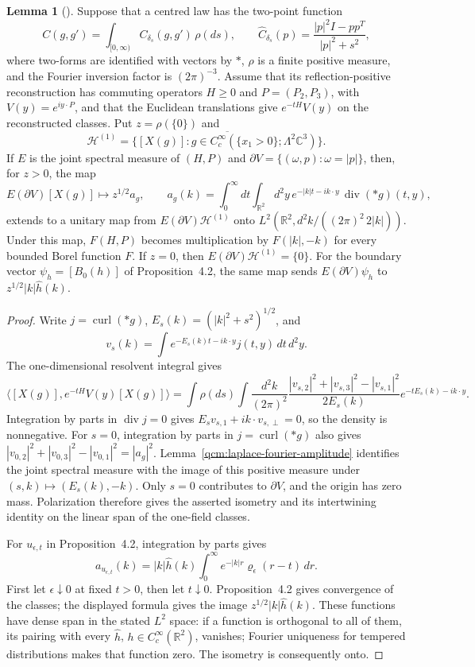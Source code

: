 \documentclass[11pt,letterpaper,reqno]{amsart}
\theoremstyle{definition}
\newtheorem{qcmlemma}[qcmproposition]{Lemma}
\newenvironment{lemma}[1][]{\pushQED{\qed}\renewcommand{\qedsymbol}{$\blacksquare$}\begin{qcmlemma}[#1]}{\popQED\end{qcmlemma}}
\begin{document}
\begin{lemma}\label{qcm:one-field-amplitude}
Suppose that a centred law has the two-point function
\[
 C(g,g')=\int_{[0,\infty)} C_{\delta_s}(g,g')\,\rho(ds),\qquad
 \widehat C_{\delta_s}(p)=
 \frac{|p|^2I-pp^T}{|p|^2+s^2},
\]
where two-forms are identified with vectors by $\ast$, $\rho$ is a
finite positive measure, and the Fourier inversion factor is
$(2\pi)^{-3}$. Assume that its reflection-positive reconstruction
has commuting operators $H\ge0$ and $P=(P_2,P_3)$, with
$V(y)=e^{iy\cdot P}$, and that the Euclidean translations give
$e^{-tH}V(y)$ on the reconstructed classes. Put
$z=\rho(\{0\})$ and
\[
 \mathcal H^{(1)}=
 \overline{\{[X(g)]:g\in C_c^\infty(\{x_1>0\};\Lambda^2\mathbb C^3)\}}.
\]
If $E$ is the joint spectral measure of $(H,P)$ and
$\partial V=\{(\omega,p):\omega=|p|\}$, then, for $z>0$, the map
\[
 E(\partial V)[X(g)]\longmapsto z^{1/2}a_g,
 \qquad
 a_g(k)=\int_0^\infty\!dt\int_{\mathbb R^2}\!d^2y\,
 e^{-|k|t-ik\cdot y}\,\operatorname{div}(\ast g)(t,y),
\]
extends to a unitary map from $E(\partial V)\mathcal H^{(1)}$ onto
$L^2(\mathbb R^2,d^2k/((2\pi)^2\,2|k|))$. Under this map,
$F(H,P)$ becomes multiplication by $F(|k|,-k)$ for every bounded
Borel function $F$. If $z=0$, then
$E(\partial V)\mathcal H^{(1)}=\{0\}$.
For the boundary vector $\psi_h=[B_0(h)]$ of Proposition~4.2,
the same map sends $E(\partial V)\psi_h$ to
$z^{1/2}|k|\hat h(k)$.
\end{lemma}
\begin{proof}
Write $j=\operatorname{curl}(\ast g)$,
$E_s(k)=(|k|^2+s^2)^{1/2}$, and
\[
 v_s(k)=\int e^{-E_s(k)t-ik\cdot y}j(t,y)\,dt\,d^2y.
\]
The one-dimensional resolvent integral gives
\[
 \langle[X(g)],e^{-tH}V(y)[X(g)]\rangle
 =\int\rho(ds)\int\frac{d^2k}{(2\pi)^2}
 \frac{|v_{s,2}|^2+|v_{s,3}|^2-|v_{s,1}|^2}{2E_s(k)}
 e^{-tE_s(k)-ik\cdot y}.
\]
Integration by parts in $\operatorname{div}j=0$ gives
$E_sv_{s,1}+ik\cdot v_{s,\perp}=0$, so the density is nonnegative.
For $s=0$, integration by parts in $j=\operatorname{curl}(\ast g)$
also gives
$|v_{0,2}|^2+|v_{0,3}|^2-|v_{0,1}|^2=|a_g|^2$.
Lemma~\ref{qcm:laplace-fourier-amplitude}
identifies the joint spectral measure with the image of this
positive measure under $(s,k)\mapsto(E_s(k),-k)$.
Only $s=0$ contributes to $\partial V$, and the origin has zero
mass. Polarization therefore gives the asserted isometry and its
intertwining identity on the linear span of the one-field classes.

For $u_{\epsilon,t}$ in Proposition~4.2, integration by parts gives
\[
 a_{u_{\epsilon,t}}(k)=|k|\hat h(k)
       \int_0^\infty e^{-|k|r}\varrho_\epsilon(r-t)\,dr.
\]
First let $\epsilon\downarrow0$ at fixed $t>0$, then let
$t\downarrow0$. Proposition~4.2 gives convergence of the classes;
the displayed formula gives the image $z^{1/2}|k|\hat h(k)$.
These functions have dense span in the stated $L^2$ space: if a
function is orthogonal to all of them, its pairing with every
$\hat h$, $h\in C_c^\infty(\mathbb R^2)$, vanishes; Fourier
uniqueness for tempered distributions makes that function zero.
The isometry is consequently onto.
\end{proof}
\end{document}

